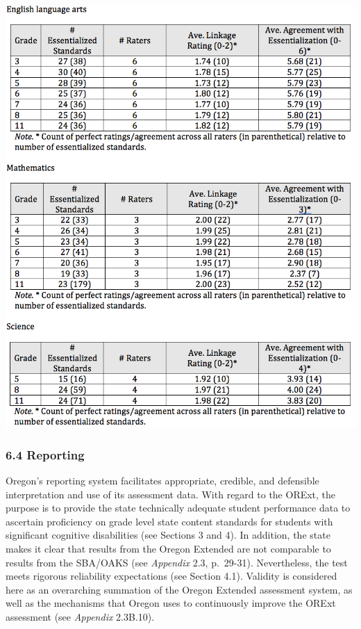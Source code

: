 \documentclass[]{article}
\begin{document}
\FloatBarrier
\includegraphics{tifs/alignstudy.png}

\subsubsection{6.4 Reporting}\label{reporting}

Oregon's reporting system facilitates appropriate, credible, and
defensible interpretation and use of its assessment data. With regard to
the ORExt, the purpose is to provide the state technically adequate
student performance data to ascertain proficiency on grade level state
content standards for students with significant cognitive disabilities
(see Sections 3 and 4). In addition, the state makes it clear that
results from the Oregon Extended are not comparable to results from the
SBA/OAKS (see \emph{Appendix} 2.3, p.~29-31). Nevertheless, the test
meets rigorous reliability expectations (see Section 4.1). Validity is
considered here as an overarching summation of the Oregon Extended
assessment system, as well as the mechanisms that Oregon uses to
continuously improve the ORExt assessment (see \emph{Appendix} 2.3B.10).
\end{document}
